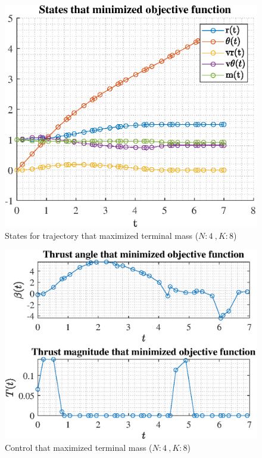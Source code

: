 \documentclass[]{article}
\begin{document}
\begin{figure}
	\centering
	\includegraphics[scale=0.75]{states_N4_K8_C3_mf.eps}
	\caption{States for trajectory that maximized terminal mass (\(N:4\ , K:8\))}
	\label{fig:states_N4_K8_C3_mf}
\end{figure}
\begin{figure}
	\centering
	\includegraphics[scale=0.75]{control_N4_K8_C3_mf.eps}
	\caption{Control that maximized terminal mass (\(N:4\ , K:8\))}
	\label{fig:control_N4_K8_C3_mf}
\end{figure}
\end{document}
